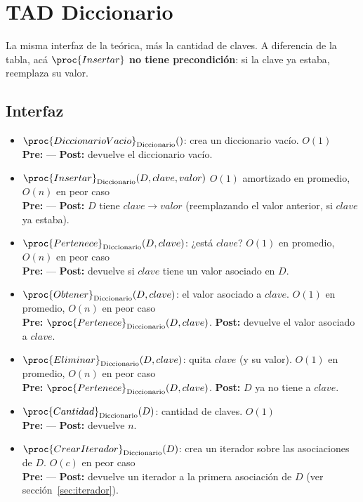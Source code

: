 \documentclass{article}
\newcommand{\OP}[2]{\proc{#1}_{\text{#2}}}
\begin{document}
\section{TAD Diccionario}

La misma interfaz de la teórica, más la cantidad de claves. A
diferencia de la tabla, acá $\proc{Insertar}$ \textbf{no tiene
precondición}: si la clave ya estaba, reemplaza su valor.

\subsection{Interfaz}

\begin{itemize}
\item $\OP{DiccionarioVacio}{Diccionario}()$: crea un diccionario vacío. \hfill $O(1)$ \\
  {\footnotesize \textbf{Pre:} --- \quad \textbf{Post:} devuelve el diccionario vacío.}
\item $\OP{Insertar}{Diccionario}(D, clave, valor)$ \hfill $O(1)$ amortizado en promedio, $O(n)$ en peor caso \\
  {\footnotesize \textbf{Pre:} --- \quad \textbf{Post:} $D$ tiene $clave \to valor$ (reemplazando el valor anterior, si $clave$ ya estaba).}
\item $\OP{Pertenece}{Diccionario}(D, clave)$: ¿está $clave$? \hfill $O(1)$ en promedio, $O(n)$ en peor caso \\
  {\footnotesize \textbf{Pre:} --- \quad \textbf{Post:} devuelve si $clave$ tiene un valor asociado en $D$.}
\item $\OP{Obtener}{Diccionario}(D, clave)$: el valor asociado a $clave$. \hfill $O(1)$ en promedio, $O(n)$ en peor caso \\
  {\footnotesize \textbf{Pre:} $\OP{Pertenece}{Diccionario}(D, clave)$. \quad \textbf{Post:} devuelve el valor asociado a $clave$.}
\item $\OP{Eliminar}{Diccionario}(D, clave)$: quita $clave$ (y su valor). \hfill $O(1)$ en promedio, $O(n)$ en peor caso \\
  {\footnotesize \textbf{Pre:} $\OP{Pertenece}{Diccionario}(D, clave)$. \quad \textbf{Post:} $D$ ya no tiene a $clave$.}
\item $\OP{Cantidad}{Diccionario}(D)$: cantidad de claves. \hfill $O(1)$ \\
  {\footnotesize \textbf{Pre:} --- \quad \textbf{Post:} devuelve $n$.}
\item $\OP{CrearIterador}{Diccionario}(D)$: crea un iterador sobre las asociaciones de $D$. \hfill $O(c)$ en peor caso \\
  {\footnotesize \textbf{Pre:} --- \quad \textbf{Post:} devuelve un iterador a la primera asociación de $D$ (ver sección~\ref{sec:iterador}).}
\end{itemize}
\end{document}
